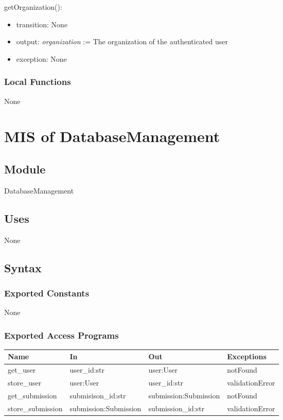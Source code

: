 \documentclass[12pt, titlepage]{article}
\begin{document}
\noindent getOrganization():
\begin{itemize}
\item transition: None
\item output: \textit{organization} := The organization of the authenticated user
\item exception: None
\end{itemize}


\subsubsection{Local Functions}

None

\newpage

\section{MIS of DatabaseManagement} \label{DatabaseManagementModule}

\subsection{Module}

DatabaseManagement

\subsection{Uses}

None

\subsection{Syntax}

\subsubsection{Exported Constants}

None

\subsubsection{Exported Access Programs}

\begin{center}
\begin{tabular}{p{3cm} p{4cm} p{4cm} p{3cm}}
\hline
\textbf{Name} & \textbf{In} & \textbf{Out} & \textbf{Exceptions} \\
\hline
get\_user & user\_id:str & user:User & notFound \\
\hline
store\_user & user:User & user\_id:str & validationError \\
\hline
get\_submission & submisison\_id:str & submission:Submission & notFound \\
\hline
store\_submission & submission:Submission & submission\_id:str & validationError \\
\hline
\end{tabular}
\end{center}
\end{document}
